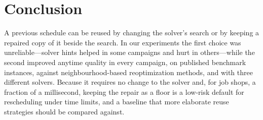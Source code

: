\documentclass[letterpaper]{article} %
\begin{document}
\section{Conclusion}

A previous schedule can be reused by changing the solver's search or by keeping a repaired copy of it beside the search. In our experiments the first choice was unreliable---solver hints helped in some campaigns and hurt in others---while the second improved anytime quality in every campaign, on published benchmark instances, against neighbourhood-based reoptimization methods, and with three different solvers. Because it requires no change to the solver and, for job shops, a fraction of a millisecond, keeping the repair as a floor is a low-risk default for rescheduling under time limits, and a baseline that more elaborate reuse strategies should be compared against.


\end{document}
